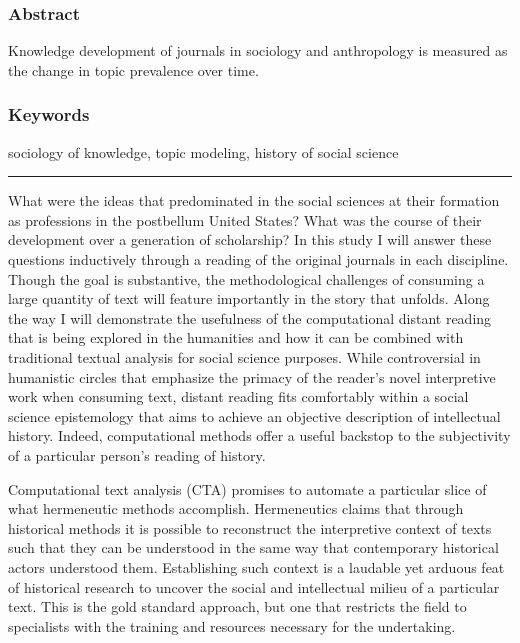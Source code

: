 \documentclass[]{book}
\theoremstyle{definition}
\theoremstyle{definition}
\theoremstyle{definition}
\theoremstyle{remark}
\begin{document}
\hypertarget{abstract-3}{%
\subsubsection*{Abstract}\label{abstract-3}}


Knowledge development of journals in sociology and
anthropology is measured as the change in topic prevalence over time.

\hypertarget{keywords-3}{%
\subsubsection*{Keywords}\label{keywords-3}}


sociology of knowledge, topic modeling, history of social
science

\begin{center}\rule{0.5\linewidth}{\linethickness}\end{center}

What were the ideas that predominated in the social sciences at their
formation as professions in the postbellum United States? What was the
course of their development over a generation of scholarship? In this
study I will answer these questions inductively through a reading of the
original journals in each discipline. Though the goal is substantive,
the methodological challenges of consuming a large quantity of text will
feature importantly in the story that unfolds. Along the way I will
demonstrate the usefulness of the computational distant reading that is
being explored in the humanities and how it can be combined with
traditional textual analysis for social science purposes. While
controversial in humanistic circles that emphasize the primacy of the
reader's novel interpretive work when consuming text, distant reading
fits comfortably within a social science epistemology that aims to
achieve an objective description of intellectual history. Indeed,
computational methods offer a useful backstop to the subjectivity of a
particular person's reading of history.

Computational text analysis (CTA) promises to automate a particular
slice of what hermeneutic methods accomplish. Hermeneutics claims that
through historical methods it is possible to reconstruct the
interpretive context of texts such that they can be understood in the
same way that contemporary historical actors understood them.
Establishing such context is a laudable yet arduous feat of historical
research to uncover the social and intellectual milieu of a particular
text. This is the gold standard approach, but one that restricts the
field to specialists with the training and resources necessary for the
undertaking.
\end{document}
